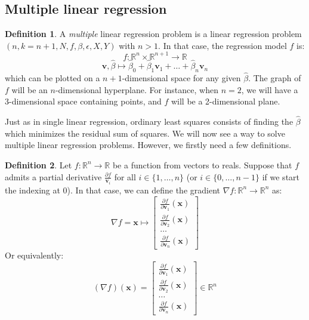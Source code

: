 \documentclass{article}
\theoremstyle{definition}
\newtheorem{definition}{Definition}[section]
\theoremstyle{remark}
\newtheorem*{remark}{Remark}
\theoremstyle{example}
\newcommand{\vv}{\mathbf{v}}
\newcommand{\betat}{\hat{\beta}}
\newcommand{\x}{\mathbf{x}}
\begin{document}

\subsection{Multiple linear regression}

\begin{definition}
		A \textit{multiple} linear regression problem is a linear regression problem $(n, k=n+1, N, f, \beta, \epsilon, X, Y)$ with $n>1$. In that case, the regression model $f$ is:
				$$f : \mathbb{R}^n \times \mathbb{R}^{n+1} \rightarrow \mathbb{R}$$
				$$\vv, \betat \mapsto \betat_0 + \betat_1 \vv_1 + \dots + \betat_n \vv_n$$ 
		which can be plotted on a $n+1$-dimensional space for any given $\betat$. The graph of $f$ will be an $n$-dimensional hyperplane. For instance, when $n=2$, we will have a 3-dimensional space containing points, and $f$ will be a 2-dimensional plane.
\end{definition}

Just as in single linear regression, ordinary least squares consists of finding the $\betat$ which minimizes the residual sum of squares. We will now see a way to solve multiple linear regression problems. However, we firstly need a few definitions.

\begin{definition}
		Let $f : \mathbb{R}^n \rightarrow \mathbb{R}$ be a function from vectors to reals. Suppose that $f$ admits a partial derivative $\frac{\partial f}{\vv_i}$ for all $i \in \{1, \dots, n\}$ (or $i \in \{0, \dots, n-1\}$ if we start the indexing at 0). In that case, we can define the gradient $\nabla f : \mathbb{R}^n \rightarrow \mathbb{R}^n$ as:
		$$\nabla f = \x \mapsto \begin{bmatrix} \frac{\partial f}{\partial \vv_1}(\x) \\ \frac{\partial f}{\partial \vv_2}(\x) \\ \dots \\ \frac{\partial f}{\partial \vv_n}(\x) \end{bmatrix}$$
		Or equivalently:
				$$(\nabla f)(\x) = \begin{bmatrix} \frac{\partial f}{\partial \vv_1}(\x) \\ \frac{\partial f}{\partial \vv_2}(\x) \\ \dots \\ \frac{\partial f}{\partial \vv_n}(\x) \end{bmatrix} \in \mathbb{R}^n$$
\end{definition}
\end{document}
